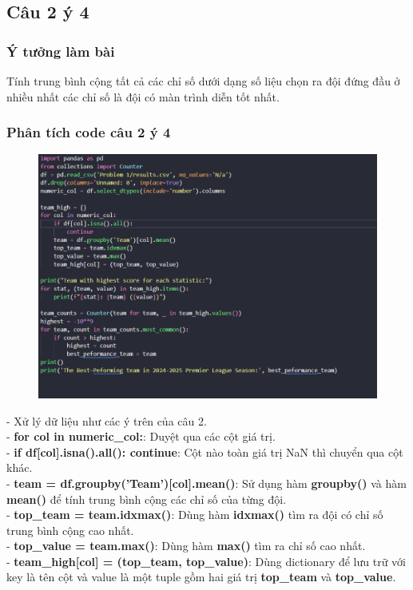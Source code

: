 \subsection{Câu 2 ý 4} 
\subsubsection{Ý tưởng làm bài}
Tính trung bình cộng tất cả các chỉ số dưới dạng số liệu chọn ra đội đứng đầu ở nhiều nhất các chỉ số là đội có màn trình diễn tốt nhất.
\subsubsection{Phân tích code câu 2 ý 4}
\begin{figure}[H]
    \centering
    \includegraphics[width=1\linewidth]{img/2-4.png}
\end{figure}
- Xử lý dữ liệu như các ý trên của câu 2.\\
- \textbf{for col in numeric\_col:}: Duyệt qua các cột giá trị.\\
- \textbf{if df[col].isna().all(): continue}: Cột nào toàn giá trị NaN thì chuyển qua cột khác.\\
- \textbf{team = df.groupby('Team')[col].mean()}: Sử dụng hàm \textbf{groupby()} và hàm \textbf{mean()} để tính trung bình cộng các chỉ số của từng đội.\\
- \textbf{top\_team = team.idxmax()}: Dùng hàm \textbf{idxmax()} tìm ra đội có chỉ số trung bình cộng cao nhất.\\
- \textbf{top\_value = team.max()}: Dùng hàm \textbf{max()} tìm ra chỉ số cao nhất.\\
- \textbf{team\_high[col] = (top\_team, top\_value)}: Dùng dictionary để lưu trữ với key là tên cột và value là một tuple gồm hai giá trị \textbf{top\_team} và \textbf{top\_value}.\\
